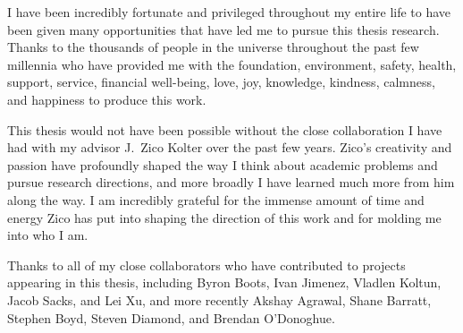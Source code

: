 \begin{acknowledgments}
    I have been incredibly fortunate and privileged throughout
    my entire life to have been given many opportunities
    that have led me to pursue this thesis research.
    Thanks to the thousands of people in the universe throughout
    the past few millennia who have provided me with the
    foundation, environment, safety, health, support, service,
    financial well-being, love, joy, knowledge, kindness, calmness,
    and happiness to produce this work.

    This thesis would not have been possible without the close
    collaboration I have had with my advisor J.~Zico Kolter over
    the past few years.
    Zico's creativity and passion have profoundly shaped
    the way I think about academic problems and pursue
    research directions, and more broadly I have learned much
    more from him along the way.
    I am incredibly grateful for the immense
    amount of time and energy Zico has put into shaping the
    direction of this work and for molding me into who I am.

    Thanks to all of my close collaborators who have contributed
    to projects appearing in this thesis, including
    Byron Boots, Ivan Jimenez, Vladlen Koltun, Jacob Sacks, and Lei Xu,
    and more recently
    Akshay Agrawal,
    Shane Barratt,
    Stephen Boyd,
    Steven Diamond,
    and Brendan O'Donoghue.


\end{acknowledgments}
